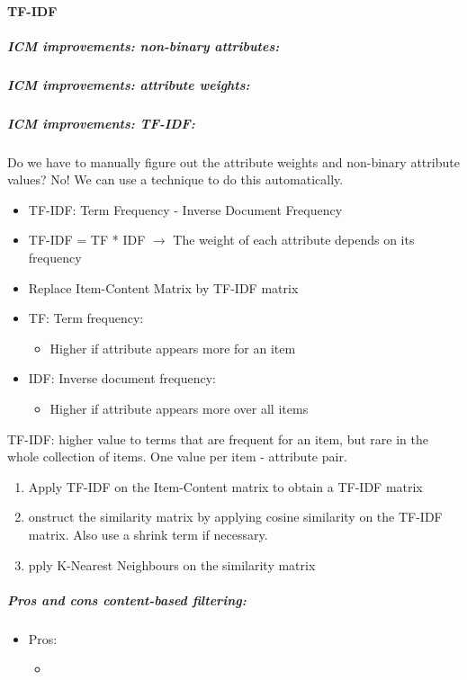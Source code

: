 \documentclass[12pt]{article}
\begin{document}
\paragraph{TF-IDF}
\subparagraph{ICM improvements: non-binary attributes:}
\subparagraph{ICM improvements: attribute weights:}
\subparagraph{ICM improvements: TF-IDF:}
Do we have to manually figure out the attribute weights and non-binary attribute values?
No! We can use a technique to do this automatically.
\begin{itemize}
    \item TF-IDF: Term Frequency - Inverse Document Frequency
    \item TF-IDF = TF * IDF $\rightarrow$ The weight of each attribute depends on its frequency
    \item Replace Item-Content Matrix by TF-IDF matrix
\end{itemize}
\begin{itemize}
    \item TF: Term frequency:\begin{itemize}
        \item Higher if attribute appears more for an item
    \end{itemize}
    \item IDF: Inverse document frequency:\begin{itemize}
        \item Higher if attribute appears more over all items
    \end{itemize}
\end{itemize}
TF-IDF: higher value to terms that are frequent for an item, but rare in the whole collection of items. One value per item - attribute pair.
\begin{enumerate}
    \item Apply TF-IDF on the Item-Content matrix to obtain a TF-IDF matrix
    \item onstruct the similarity matrix by applying cosine similarity on the TF-IDF matrix. Also use a shrink term if necessary.
    \item pply K-Nearest Neighbours on the similarity matrix
\end{enumerate}
\subparagraph{Pros and cons content-based filtering:}
\begin{itemize}
    \item Pros:\begin{itemize}
        \item 
    \end{itemize}
\end{itemize}
\end{document}
